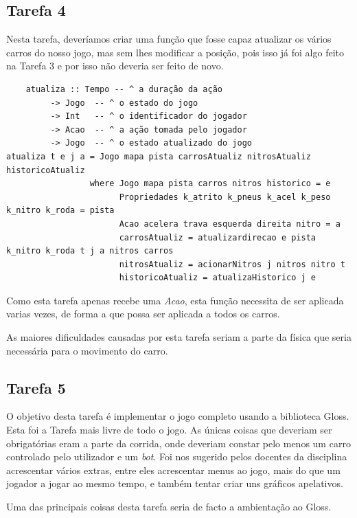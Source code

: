 \documentclass[a4paper]{report} %
\begin{document}
\subsection{Tarefa 4}

    Nesta tarefa, deveríamos criar uma função que fosse capaz atualizar os vários carros do nosso jogo, mas sem lhes modificar a posição, pois isso já foi algo feito na Tarefa 3 e por isso não deveria ser feito de novo. 
    
      \begin{verbatim} 
    atualiza :: Tempo -- ^ a duração da ação
         -> Jogo  -- ^ o estado do jogo
         -> Int   -- ^ o identificador do jogador
         -> Acao  -- ^ a ação tomada pelo jogador
         -> Jogo  -- ^ o estado atualizado do jogo
atualiza t e j a = Jogo mapa pista carrosAtualiz nitrosAtualiz historicoAtualiz
                 where Jogo mapa pista carros nitros historico = e
                       Propriedades k_atrito k_pneus k_acel k_peso k_nitro k_roda = pista
                       Acao acelera trava esquerda direita nitro = a
                       carrosAtualiz = atualizardirecao e pista k_nitro k_roda t j a nitros carros
                       nitrosAtualiz = acionarNitros j nitros nitro t  
                       historicoAtualiz = atualizaHistorico j e
\end{verbatim}

   Como esta tarefa apenas recebe uma \textit{Acao}, esta função necessita de ser aplicada varias vezes, de forma a que possa ser aplicada a todos os carros.
   
   As maiores dificuldades causadas por esta tarefa seriam a parte da física que seria necessária para o movimento do carro.

\subsection{Tarefa 5}

 O objetivo desta tarefa é implementar o jogo completo usando a biblioteca Gloss. 
 Esta foi a Tarefa mais livre de todo o jogo. As únicas coisas que deveriam ser obrigatórias eram a parte da corrida, onde deveriam constar pelo menos um carro controlado pelo utilizador e um \textit{bot}.
 Foi nos sugerido pelos docentes da disciplina acrescentar vários extras, entre eles acrescentar menus ao jogo, mais do que um jogador a jogar ao mesmo tempo, e também tentar criar uns gráficos apelativos.
 
 Uma das principais coisas desta tarefa seria de facto a ambientação ao Gloss.
\end{document}
